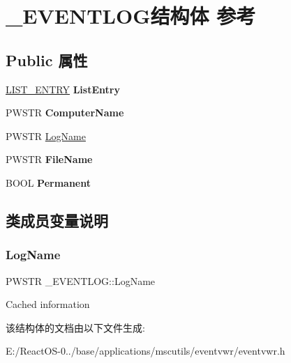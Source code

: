 \hypertarget{struct___e_v_e_n_t_l_o_g}{}\section{\+\_\+\+E\+V\+E\+N\+T\+L\+O\+G结构体 参考}
\label{struct___e_v_e_n_t_l_o_g}
\subsection*{Public 属性}
\begin{DoxyCompactItemize}
\item 
\mbox{\label{struct___e_v_e_n_t_l_o_g_af90f662b7fb911376e5ef238eab3a5b6}} 
\hyperlink{struct___l_i_s_t___e_n_t_r_y}{L\+I\+S\+T\+\_\+\+E\+N\+T\+RY} {\bfseries List\+Entry}
\item 
\mbox{\label{struct___e_v_e_n_t_l_o_g_a243b072dd355dfadc3f2683867eca2b3}} 
P\+W\+S\+TR {\bfseries Computer\+Name}
\item 
P\+W\+S\+TR \hyperlink{struct___e_v_e_n_t_l_o_g_a0a862036adc0e14b0f714c1c37a3e9a8}{Log\+Name}
\item 
\mbox{\label{struct___e_v_e_n_t_l_o_g_adedb52f563cdcabb8c7b90094eee41e0}} 
P\+W\+S\+TR {\bfseries File\+Name}
\item 
\mbox{\label{struct___e_v_e_n_t_l_o_g_a394730d0a16e2f30e5124de9674c1661}} 
B\+O\+OL {\bfseries Permanent}
\end{DoxyCompactItemize}


\subsection{类成员变量说明}
\mbox{\label{struct___e_v_e_n_t_l_o_g_a0a862036adc0e14b0f714c1c37a3e9a8}} 
\subsubsection{\texorpdfstring{Log\+Name}{LogName}}
{\footnotesize\ttfamily P\+W\+S\+TR \+\_\+\+E\+V\+E\+N\+T\+L\+O\+G\+::\+Log\+Name}

Cached information 

该结构体的文档由以下文件生成\+:\begin{DoxyCompactItemize}
\item 
E\+:/\+React\+O\+S-\/0../base/applications/mscutils/eventvwr/eventvwr.\+h\end{DoxyCompactItemize}
